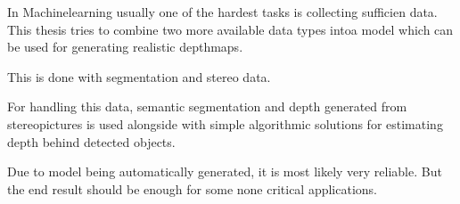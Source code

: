 In Machinelearning usually one of the hardest tasks is collecting sufficien data.
This thesis tries to combine two more available data types intoa model which can be used for generating realistic depthmaps.

This is done with segmentation and stereo data.

For handling this data, semantic segmentation and depth generated from stereopictures is used
alongside with simple algorithmic solutions for estimating depth behind detected objects.

Due to model being automatically generated, it is most likely very reliable.
But the end result should be enough for some none critical applications.
